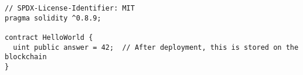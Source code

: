 \begin{lstlisting}[language=Solidity]
// SPDX-License-Identifier: MIT
pragma solidity ^0.8.9;

contract HelloWorld {
  uint public answer = 42;  // After deployment, this is stored on the blockchain
}
\end{lstlisting}